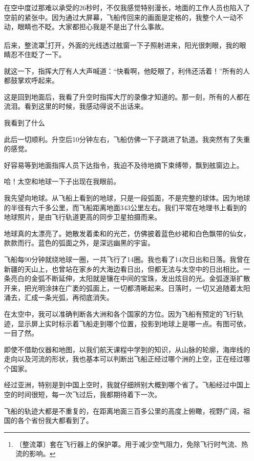 \documentclass[12pt,UTF-8,openany]{ctexbook}
\begin{document}
\begin{large}
    在空中度过那难以承受的26秒时，不仅我感觉特别漫长，地面的工作人员也陷入了空前的紧张中。因为通过大屏幕，飞船传回来的画面是定格的，我整个人一动不动，眼睛也不眨。大家都担心我是不是出了什么事故。
    
    后来，整流罩\footnote{〔整流罩〕套在飞行器上的保护罩。用于减少空气阻力，免除飞行时气流、热流的影响。}打开，外面的光线透过舷窗一下子照射进来，阳光很刺眼，我的眼睛忍不住眨了一下。
    
    就这一下，指挥大厅有人大声喊道：“快看啊，他眨眼了，利伟还活着！”所有的人都鼓掌欢呼起来。
    
    这是回到地面后，我看了升空时指挥大厅的录像才知道的。那一刻，所有的人都在流泪。看到这里的时候，我感动得说不出话来。
    
    我看到了什么
    
    此后一切顺利。升空后10分钟左右，飞船仿佛一下子跳进了轨道。我突然有了失重的感觉。
    
    好容易等到地面指挥人员下达指令，我迫不及待地摘下束缚带，飘到舷窗边上。
    
    哈！太空和地球一下子出现在我眼前。
    
    我先望向地球。从飞船上看到的地球，只是一段弧面，不是完整的球体。因为地球的半径有六千多公里，而飞船距离地面343公里左右。我们平常在地理书上看到的地球照片，是由飞行轨道更高的同步卫星拍摄而来。
    
    地球真的太漂亮了。她散发着柔和的光芒，仿佛披着蓝色纱裙和白色飘带的仙女，款款而行。蓝色的弧面之外，是深远幽黑的宇宙。
    
    飞船每90分钟就绕地球一圈，一共飞行了14圈。我也看了14次日出和日落。我曾在新疆的天山上，也曾站在家乡的大海边看日出，但都无法与太空中的日出相比。一条亮白的金弧不断延伸，太阳就是镶在中间的宝珠，发出炫目的光。金弧逐渐扩散开来，把光明涂抹在广袤的弧面上，一切都清晰起来。日落时，一切又追随着太阳涌去，汇成一条光弧，再彻底消失。
    
    在太空中，我可以准确判断各大洲和各个国家的方位。因为飞船有预定的飞行轨迹，显示屏上实时标示着飞船走到哪个位置，投影到地球上是哪一点。有图可依，一目了然。
    
    即使不借助仪器和地图，以我们航天课程中学到的知识，从山脉的轮廓，海岸线的走向以及河流的形状，我也基本可以判断出飞船正经过哪个洲的上空，正在经过哪个国家。
    
    经过亚洲，特别是到中国上空时，我就仔细辨别大概到哪个省了。飞船经过中国上空的时间很短，每一次飞过后，我都期待着下一次。
    
    飞船的轨迹大都是不重复的，在距离地面三百多公里的高度上俯瞰，视野广阔，祖国的各个省份我大都看到了。
    

\end{large}
\end{document}
